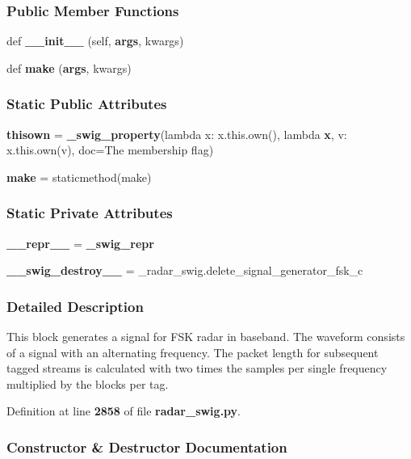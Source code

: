 \subsubsection*{Public Member Functions}
\begin{DoxyCompactItemize}
\item 
def {\bf \+\_\+\+\_\+init\+\_\+\+\_\+} (self, {\bf args}, kwargs)
\item 
def {\bf make} ({\bf args}, kwargs)
\end{DoxyCompactItemize}
\subsubsection*{Static Public Attributes}
\begin{DoxyCompactItemize}
\item 
{\bf thisown} = {\bf \+\_\+swig\+\_\+property}(lambda x\+: x.\+this.\+own(), lambda {\bf x}, v\+: x.\+this.\+own(v), doc=\textquotesingle{}The membership flag\textquotesingle{})
\item 
{\bf make} = staticmethod(make)
\end{DoxyCompactItemize}
\subsubsection*{Static Private Attributes}
\begin{DoxyCompactItemize}
\item 
{\bf \+\_\+\+\_\+repr\+\_\+\+\_\+} = {\bf \+\_\+swig\+\_\+repr}
\item 
{\bf \+\_\+\+\_\+swig\+\_\+destroy\+\_\+\+\_\+} = \+\_\+radar\+\_\+swig.\+delete\+\_\+signal\+\_\+generator\+\_\+fsk\+\_\+c
\end{DoxyCompactItemize}


\subsubsection{Detailed Description}
\begin{DoxyVerb}This block generates a signal for FSK radar in baseband. The waveform consists of a signal with an alternating frequency. The packet length for subsequent tagged streams is calculated with two times the samples per single frequency multiplied by the blocks per tag.\end{DoxyVerb}
 

Definition at line {\bf 2858} of file {\bf radar\+\_\+swig.\+py}.



\subsubsection{Constructor \& Destructor Documentation}
